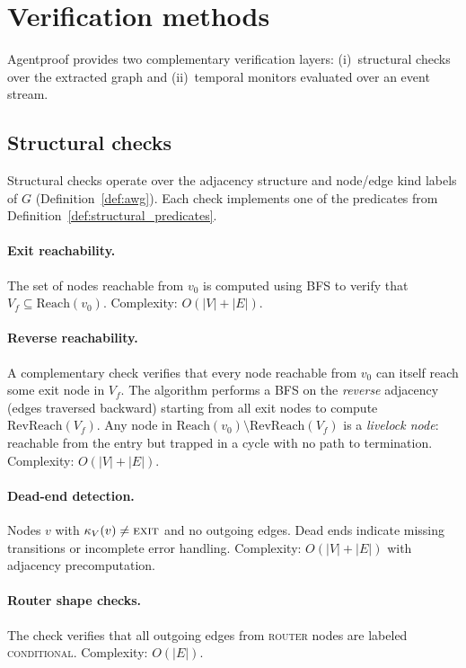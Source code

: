 \section{Verification methods}
\label{sec:verification_methods}

Agentproof provides two complementary verification layers: (i)~structural checks
over the extracted graph and (ii)~temporal monitors evaluated over an
event stream.

\subsection{Structural checks}
Structural checks operate over the adjacency structure and node/edge
kind labels of $G$ (Definition~\ref{def:awg}). Each check implements
one of the predicates from Definition~\ref{def:structural_predicates}.

\paragraph{Exit reachability.}
The set of nodes reachable from $v_0$ is computed using BFS to verify
that $V_f \subseteq \mathrm{Reach}(v_0)$.
Complexity: $O(|V| + |E|)$.

\paragraph{Reverse reachability.}
A complementary check verifies that every node reachable from $v_0$ can
itself reach some exit node in $V_f$.  The algorithm performs a BFS on the
\emph{reverse} adjacency (edges traversed backward) starting from all exit
nodes to compute $\mathrm{RevReach}(V_f)$.  Any node in
$\mathrm{Reach}(v_0) \setminus \mathrm{RevReach}(V_f)$ is a
\emph{livelock node}: reachable from the entry but trapped in a cycle with
no path to termination.
Complexity: $O(|V| + |E|)$.

\paragraph{Dead-end detection.}
Nodes $v$ with $\kappa_V(v) \neq \textsc{exit}$ and no
outgoing edges. Dead ends indicate missing transitions or incomplete
error handling.
Complexity: $O(|V| + |E|)$ with adjacency precomputation.

\paragraph{Router shape checks.}
The check verifies that all outgoing edges from \textsc{router} nodes are labeled
\textsc{conditional}. Complexity: $O(|E|)$.

